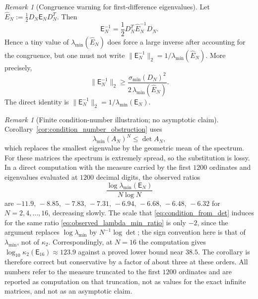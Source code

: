 \documentclass[preprint,12pt]{elsarticle}
\numberwithin{equation}{section}
\theoremstyle{plain}
\theoremstyle{definition}
\theoremstyle{remark}
\newtheorem{remark}[theorem]{Remark}
\newcommand{\E}{\mathsf E}
\begin{document}
\begin{remark}[Congruence warning for first-difference eigenvalues]
\label{rem:first_difference_inverse_congruence}
Let
\(\widehat E_N:=\tfrac12D_N\E_ND_N^T\).  Then
\begin{equation}
\E_N^{-1}=\frac12D_N^T\widehat E_N^{-1}D_N.
\label{eq:E_inverse_from_Ehat}
\end{equation}
Hence a tiny value of \(\lambda_{\min}(\widehat E_N)\) does force a large inverse after
accounting for the congruence, but one must not write
\(\|\E_N^{-1}\|_2=1/\lambda_{\min}(\widehat E_N)\).  More precisely,
\begin{equation}
\|\E_N^{-1}\|_2
\ge
\frac{\sigma_{\min}(D_N)^2}{2\,\lambda_{\min}(\widehat E_N)}.
\label{eq:E_inverse_Ehat_lower}
\end{equation}
The direct identity is
\(\|\E_N^{-1}\|_2=1/\lambda_{\min}(\E_N)\).
\end{remark}

\begin{remark}[Finite condition-number illustration; no asymptotic claim]
\label{rem:condition_number_not_sharp}
Corollary~\ref{cor:condition_number_obstruction} uses
\[
\lambda_{\min}(A_N)^N\le\det A_N,
\]
which replaces the smallest eigenvalue by the geometric mean of the spectrum.  For these matrices
the spectrum is extremely spread, so the substitution is lossy.  In a direct computation with the
measure carried by the first \(1200\) ordinates and eigenvalues evaluated at \(1200\) decimal
digits, the observed ratios
\begin{equation}
\frac{\log\lambda_{\min}(\E_N)}{N\log N}
\label{eq:observed_lambda_min_ratio}
\end{equation}
are $-11.9,\,-8.85,\,-7.83,\,-7.31,\,-6.94,\,-6.68,\,-6.48,\,-6.32$ for $N=2,4,\dots,16$, decreasing slowly. The scale that \eqref{eq:condition_from_det} induces for the same ratio \eqref{eq:observed_lambda_min_ratio} is only $-2$, since the argument replaces $\log\lambda_{\min}$ by $N^{-1}\log\det$; the sign convention here is that of $\lambda_{\min}$, not of $\kappa_2$. Correspondingly, at $N=16$ the computation gives $\log_{10}\kappa_2(\E_{16})\approx123.9$ against a proved lower bound near $38.5$. The corollary is therefore correct but conservative by a factor of about three at these orders. All numbers refer to the measure truncated to the first $1200$ ordinates and are reported as computation on that truncation, not as values for the exact infinite matrices, and not as an asymptotic claim.
\end{remark}
\end{document}
